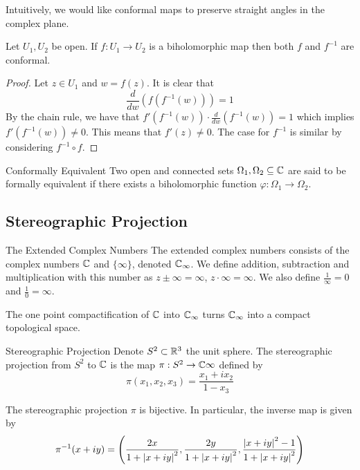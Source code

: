\documentclass[a4paper]{article}
\begin{document}
Intuitively, we would like conformal maps to preserve straight angles in the complex plane. 

\begin{lmm}{}{} Let $U_1,U_2$ be open. If $f:U_1\to U_2$ is a biholomorphic map then both $f$ and $f^{-1}$ are conformal. \tcbline
\begin{proof}
Let $z\in U_1$ and $w=f(z)$. It is clear that $$\frac{d}{dw}\left(f(f^{-1}(w))\right)=1$$ By the chain rule, we have that $f'(f^{-1}(w))\cdot\frac{d}{dw}(f^{-1}(w))=1$ which implies $f'(f^{-1}(w))\neq 0$. This means that $f'(z)\neq 0$. The case for $f^{-1}$ is similar by considering $f^{-1}\circ f$. 
\end{proof}
\end{lmm}

\begin{defn}{Conformally Equivalent}{} Two open and connected sets $\Omega_1,\Omega_2\subseteq\mathbb{C}$ are said to be formally equivalent if there exists a biholomorphic function $\varphi:\Omega_1\to\Omega_2$. 
\end{defn}

\subsection{Stereographic Projection}
\begin{defn}{The Extended Complex Numbers}{} The extended complex numbers consists of the complex numbers $\mathbb{C}$ and $\{\infty\}$, denoted $\mathbb{C}_\infty$. We define addition, subtraction and multiplication with this number as $z\pm\infty=\infty$, $z\cdot\infty=\infty$. We also define $\frac{1}{\infty}=0$ and $\frac{1}{0}=\infty$. 
\end{defn}

\begin{thm}{}{} The one point compactification of $\mathbb{C}$ into $\mathbb{C}_\infty$ turns $\mathbb{C}_\infty$ into a compact topological space. 
\end{thm}

\begin{defn}{Stereographic Projection}{} Denote $S^2\subset\mathbb{R}^3$ the unit sphere. The stereographic projection from $S^2$ to $\mathbb{C}$ is the map $\pi:S^2\to\mathbb{C}\infty$ defined by $$\pi(x_1,x_2,x_3)=\frac{x_1+ix_2}{1-x_3}$$
\end{defn}

\begin{prp}{}{} The stereographic projection $\pi$ is bijective. In particular, the inverse map is given by $$\pi^{-1}(x+iy)=\left(\frac{2x}{1+\abs{x+iy}^2},\frac{2y}{1+\abs{x+iy}^2},\frac{\abs{x+iy}^2-1}{1+\abs{x+iy}^2}\right)$$
\end{prp}
\end{document}
